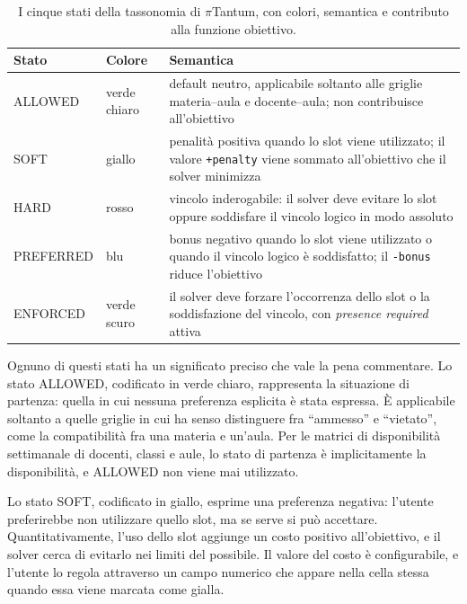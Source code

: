 \begin{table}[h]
\centering
\sffamily\small
\begin{tabular}{l l p{8.5cm}}
\toprule
\textbf{Stato} & \textbf{Colore} & \textbf{Semantica} \\
\midrule
\textcolor{cAllow}{ALLOWED}  & verde chiaro & default neutro,
  applicabile soltanto alle griglie materia--aula e docente--aula;
  non contribuisce all'obiettivo \\
\textcolor{cSoft}{SOFT}      & giallo &
  penalit\`a positiva quando lo slot viene utilizzato; il valore
  \texttt{+penalty} viene sommato all'obiettivo che il solver
  minimizza \\
\textcolor{cHard}{HARD}      & rosso &
  vincolo inderogabile: il solver deve evitare lo slot oppure
  soddisfare il vincolo logico in modo assoluto \\
\textcolor{cPref}{PREFERRED} & blu &
  bonus negativo quando lo slot viene utilizzato o quando il
  vincolo logico \`e soddisfatto; il \texttt{-bonus} riduce
  l'obiettivo \\
\textcolor{cEnf}{ENFORCED}   & verde scuro &
  il solver deve forzare l'occorrenza dello slot o la
  soddisfazione del vincolo, con \emph{presence required}
  attiva \\
\bottomrule
\end{tabular}
\caption{I cinque stati della tassonomia di $\pi$Tantum, con
colori, semantica e contributo alla funzione obiettivo.}
\label{tab:cinque-stati}
\end{table}

Ognuno di questi stati ha un significato preciso che vale la
pena commentare. Lo stato ALLOWED, codificato in verde
chiaro, rappresenta la situazione di partenza: quella in cui
nessuna preferenza esplicita \`e stata espressa. \`E
applicabile soltanto a quelle griglie in cui ha senso
distinguere fra ``ammesso'' e ``vietato'', come la
compatibilit\`a fra una materia e un'aula. Per le matrici di
disponibilit\`a settimanale di docenti, classi e aule, lo
stato di partenza \`e implicitamente la disponibilit\`a, e
ALLOWED non viene mai utilizzato.

Lo stato SOFT, codificato in giallo, esprime una preferenza
negativa: l'utente preferirebbe non utilizzare quello slot,
ma se serve si pu\`o accettare. Quantitativamente, l'uso
dello slot aggiunge un costo positivo all'obiettivo, e il
solver cerca di evitarlo nei limiti del possibile. Il valore
del costo \`e configurabile, e l'utente lo regola attraverso
un campo numerico che appare nella cella stessa quando essa
viene marcata come gialla.

